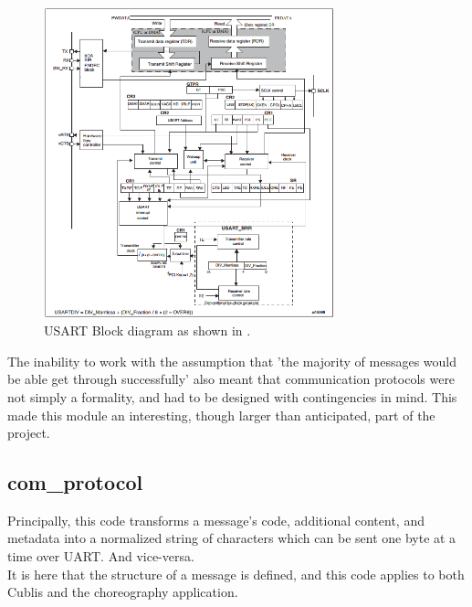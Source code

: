 \begin{figure}[ht]
   \centering
   \includegraphics[width=0.75\textwidth]{img/USART.png}
   \caption{USART Block diagram as shown in \cite{stm32manual}.}
   \label{img:USART}
\end{figure}

The inability to work with the assumption that 'the majority of messages would be able get through successfully' also meant that communication protocols were not simply a formality, and had to be designed with contingencies in mind. This made this module an interesting, though larger than anticipated, part of the project.

\subsection{com\_protocol}

Principally, this code transforms a message's code, additional content, and metadata into a normalized string of characters which can be sent one byte at a time over UART. And vice-versa.\\

It is here that the structure of a message is defined, and this code applies to both Cublis and the choreography application.\\

